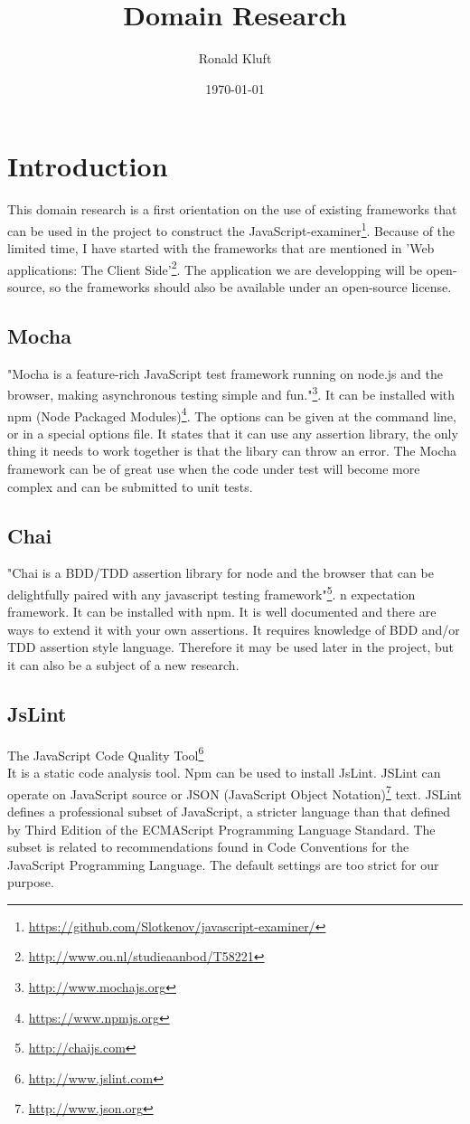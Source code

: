 \documentclass{article}
\begin{document}
\title{Domain Research}
\author{Ronald Kluft}
\date{\today}
\maketitle

\section{Introduction}
This domain research is a first orientation on the use of existing frameworks that can be used in the 
project to construct the JavaScript-examiner\footnote{\url{https://github.com/Slotkenov/javascript-examiner/}}.
Because of the limited time, I have started with the frameworks that are mentioned in 
'Web applications: The Client Side'\footnote{\url{http://www.ou.nl/studieaanbod/T58221}}.
The application we are developping will be open-source, so the frameworks should also be available
under an open-source license.

\subsection{Mocha}
"Mocha is a feature-rich JavaScript test framework running on node.js and the 
browser, making asynchronous testing simple and fun."\footnote{\url{http://www.mochajs.org}}.
It can be installed with npm (Node Packaged Modules)\footnote{\url{https://www.npmjs.org}}.
The options can be given at the command line, or in a special options file.
It states that it can use any assertion library, the only thing it needs to work together is that the libary can throw an error.
The Mocha framework can be of great use when the code under test will become more complex and can be submitted to unit tests.


\subsection{Chai}
"Chai is a BDD/TDD assertion library for node and the browser that can be delightfully paired with any javascript testing framework"\footnote{\url{http://chaijs.com}}.
n expectation framework. It can be installed with npm.
It is well documented and there are ways to extend it with your own assertions.
It requires knowledge of BDD and/or TDD assertion style language.
Therefore it may be used later in the project, but it can also be a subject of a new research.


\subsection{JsLint}
The JavaScript Code Quality Tool\footnote{\url{http://www.jslint.com}}\\
It is a static code analysis tool.
Npm can be used to install JsLint.
JSLint can operate on JavaScript source or JSON (JavaScript Object Notation)\footnote{\url{http://www.json.org}} text.
JSLint defines a professional subset of JavaScript, a stricter language than that defined by Third Edition of the ECMAScript Programming Language Standard.
The subset is related to recommendations found in Code Conventions for the JavaScript Programming Language.
The default settings are too strict for our purpose.
\end{document}
